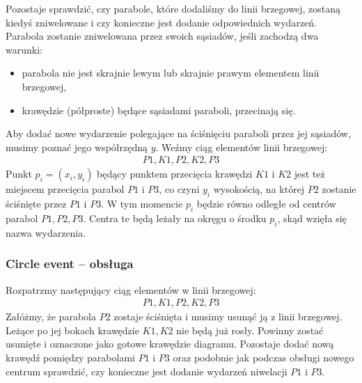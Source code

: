 \documentclass[declaration,shortabstract, inz]{iithesis}
\theoremstyle{definition} \newtheorem{definition}{Definicja}[]
\theoremstyle{plain} \newtheorem{remark}[definition]{Obserwacja}
\theoremstyle{plain} \newtheorem{theorem}[definition]{Twierdzenie}
\theoremstyle{plain} \newtheorem{example}{Przykład}[definition]
\theoremstyle{plain} \newtheorem{lemma}[definition]{Lemat}
\begin{document}
Pozostaje sprawdzić, czy parabole, które dodaliśmy do linii brzegowej, zostaną kiedyś zniwelowane i czy konieczne jest dodanie odpowiednich wydarzeń. 
Parabola zostanie zniwelowana przez swoich sąsiadów, jeśli zachodzą dwa warunki:
\begin{itemize}
	\item parabola nie jest skrajnie lewym lub skrajnie prawym elementem linii brzegowej,
	\item krawędzie (półproste) będące sąsiadami paraboli, przecinają się.
\end{itemize}
Aby dodać nowe wydarzenie polegające na ściśnięciu paraboli przez jej sąsiadów, musimy poznać jego współrzędną $y$. 
Weźmy ciąg elementów linii brzegowej:
\begin{align}
	P1, K1, P2, K2, P3
\end{align}
Punkt $p_i = (x_i, y_i)$ będący punktem przecięcia krawędzi $K1$ i $K2$ jest też miejscem przecięcia parabol $P1$ i $P3$, co czyni $y_i$
wysokością, na której $P2$ zostanie ściśnięte przez $P1$ i $P3$. W tym momencie $p_i$ będzie równo odległe od centrów parabol $P1, P2, P3$. Centra te będą leżały na okręgu o środku $p_i$, skąd wzięła się nazwa wydarzenia.


\subsubsection{Circle event -- obsługa}
\label{sec:circle}
Rozpatrzmy następujący ciąg elementów w linii brzegowej:
\begin{align}
	P1, K1, P2, K2, P3
\end{align}
Załóżmy, że parabola $P2$ zostaje ściśnięta i musimy usunąć ją z linii brzegowej. Leżące po jej bokach krawędzie $K1, K2$ nie będą już rosły. Powinny zostać usunięte i oznaczone jako gotowe krawędzie diagramu. Pozostaje dodać nową krawędź pomiędzy parabolami $P1$ i $P3$ oraz podobnie jak podczas obsługi nowego centrum sprawdzić, czy konieczne jest dodanie wydarzeń niwelacji $P1$ i $P3$.
\end{document}

